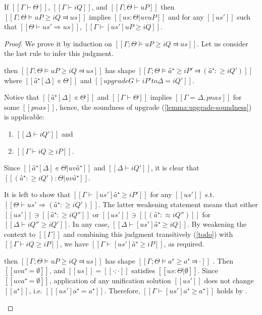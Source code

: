 \begin{lemma} \label{lemma:pos-subt-soundness}
    If $[[Γ ⊢ Θ]]$, $[[Γ ⊢ iQ]]$, and $[[Γ ; Θ ⊢ uP]]$ then\\
    $[[Γ ; Θ ⊨ uP ≥ iQ ⫤ us]]$
    implies $[[us : Θ|uv uP]]$ and 
    for any $[[us']]$ such that $[[Θ ⊢ us' ⇒ us]]$,
    $[[ Γ ⊢ [us']uP ≥ iQ ]]$.
\end{lemma}
\begin{proof} 
    We prove it by induction on $[[Γ ; Θ ⊨ uP ≥ iQ ⫤ us]]$. Let us consider the last rule to infer this judgment.
    \begin{caseof}
    \item {} then
    $[[Γ ; Θ ⊨ uP ≥ iQ ⫤ us]]$ has shape $[[Γ;Θ ⊨ â⁺ ≥ iP' ⫤ (â⁺ :≥ iQ')]]$ where
    $[[â⁺[Δ] ∊ Θ]]$ and $[[upgrade G ⊢ iP' to Δ = iQ']]$.

    Notice that $[[â⁺[Δ] ∊ Θ]]$ and $[[Γ ⊢ Θ]]$ 
    implies $[[Γ = Δ, pnas]]$ for some $[[pnas]]$, hence, the
    soundness of upgrade (\cref{lemma:upgrade-soundness}) is applicable:
    \begin{enumerate}
        \item $[[Δ ⊢ iQ']]$ and
        \item $[[Γ ⊢ iQ ≥ iP]]$.
    \end{enumerate}

    Since $[[â⁺[Δ] ∊ Θ|uv â⁺]]$ and $[[Δ ⊢ iQ']]$, it is clear that $[[(â⁺ :≥ iQ') : Θ | uv â⁺ ]]$.

    It is left to show that $[[Γ ⊢ [us']â⁺ ≥ iP']]$ for any $[[us']]$ s.t. $[[Θ ⊢ us' ⇒ (â⁺ :≥ iQ')]]$.
    The latter weakening statement means that either $[[us']] \ni [[â⁺ :≥ iQ'']]$ or
    $[[us']] \ni [[(â⁺ :≈ iQ'')]]$ for $[[Δ ⊢ iQ'' ≥ iQ']]$. In any case,
    $[[Δ ⊢ [us']â⁺ ≥ iQ]]$. By weakening the context to $[[Γ]]$ and combining this judgment
    transitively (\cref{todo}) with $[[Γ ⊢ iQ ≥ iP]]$, we have $[[Γ ⊢ [us']â⁺ ≥ iP]]$,
    as required. 

    \item  {} then
    $[[Γ ; Θ ⊨ uP ≥ iQ ⫤ us]]$ has shape $[[Γ;Θ ⊨ a⁺ ≥ a⁺ ⫤ ·]]$ .
    Then $[[uv a⁺ = ∅]]$, and $[[us]] = [[· : ·]]$ satisfies $[[us : Θ|∅]]$.
    Since $[[uv a⁺ = ∅]]$, application of any unification solution $[[us']]$ does not change $[[a⁺]]$, i.e.
    $[[ [us'] a⁺ = a⁺]]$. Therefore, $[[Γ ⊢ [us']a⁺ ≥ a⁺]]$ holds by .


\end{caseof}
\end{proof}

